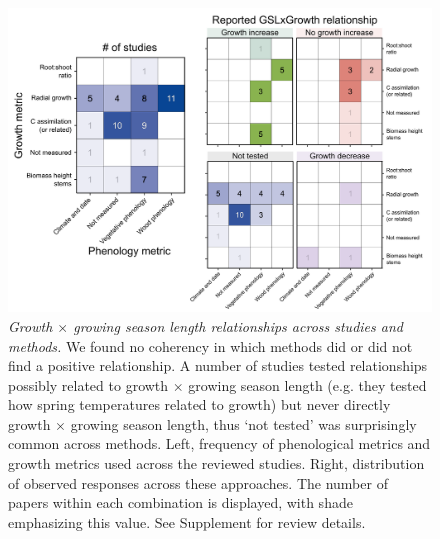 \documentclass[11pt]{article}
\begin{document}
\clearpage
\begin{figure}[h!]
\label{fig:heatmaps}
\includegraphics[width=1\textwidth]{..//figures/_figuresFromRuben/heatmap.png} %
\caption{\emph{Growth $\times$ growing season length relationships across studies and methods.} We found no coherency in which methods did or did not find a positive relationship. A number of studies tested relationships possibly related to growth $\times$ growing season length (e.g. they tested how spring temperatures related to growth) but never directly growth $\times$ growing season length, thus `not tested' was surprisingly common across methods. Left, frequency of phenological metrics and growth metrics used across the reviewed studies. Right, distribution of observed responses across these approaches. The number of papers within each combination is displayed, with shade emphasizing this value. See Supplement for review details.}
\end{figure}
\end{document}
